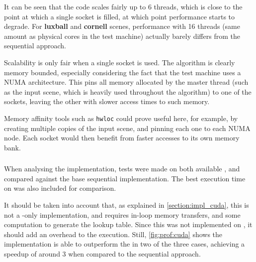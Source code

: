 \documentclass[main.tex]{subfiles}
\begin{document}
It can be seen that the code scales fairly up to 6 threads, which is close to the point at which a single \cpu socket is filled, at which point performance starts to degrade.
For \textbf{luxball} and \textbf{cornell} scenes, performance with 16 threads (same amount as physical \cpu cores in the test machine) actually barely differs from the sequential approach.

Scalability is only fair when a single socket is used. The algorithm is clearly memory bounded, especially considering the fact that the test machine uses a \acs{NUMA} architecture. This pins all memory allocated by the master thread (such as the input scene, which is heavily used throughout the algorithm) to one of the sockets, leaving the other with slower access times to such memory.

Memory affinity tools such as \texttt{hwloc} could prove useful here, for example, by creating multiple copies of the input scene, and pinning each one to each \acs{NUMA} node. Each socket would then benefit from faster accesses to its own memory bank.

\subsubsection{\gpu}

When analysing the \gpu implementation, tests were made on both available \gpus, and compared against the base sequential \cpu implementation. The best execution time on \cpu was also included for comparison.

It should be taken into account that, as explained in \cref{section:impl_cuda}, this is not a \gpu-only implementation, and requires in-loop memory transfers, and some \cpu computation to generate the lookup table. Since this was not implemented on \gpu, it should add an overhead to the execution. Still, \cref{fig:prof:cuda} shows the implementation is able to outperform the \cpu in two of the three cases, achieving a speedup of around 3 when compared to the sequential approach.
\end{document}
